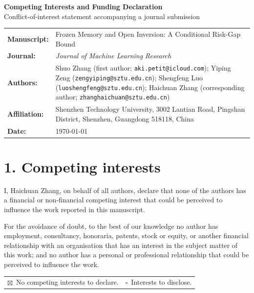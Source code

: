\documentclass[10pt]{article}
\newcommand{\checkedbox}{\ensuremath{\boxtimes}}
\newcommand{\uncheckedbox}{\ensuremath{\square}}
\begin{document}
\begin{center}
  {\Large\bfseries Competing Interests and Funding Declaration}\\[3pt]
  {\small Conflict-of-interest statement accompanying a journal submission}
\end{center}

\vspace{0.4em}

\begin{tabular}{@{}p{}p{}@{}}
\textbf{Manuscript:} &
Frozen Memory and Open Inversion: A Conditional
Risk-Gap Bound \\[4pt]
\textbf{Journal:} & \emph{Journal of Machine Learning Research} \\[4pt]
\textbf{Authors:} & {\raggedright Shuo Zhang (first author;
\texttt{aki.petit@icloud.com}); Yiping Zeng
(\texttt{zengyiping@sztu.edu.cn}); Shengfeng Luo
(\texttt{luoshengfeng@sztu.edu.cn}); Haichuan Zhang (corresponding author;
\texttt{zhanghaichuan@sztu.edu.cn})\par} \\[4pt]
\textbf{Affiliation:} & Shenzhen Technology University, 3002 Lantian Road, Pingshan
District, Shenzhen, Guangdong 518118, China \\[4pt]
\textbf{Date:} & \today
\end{tabular}

\vspace{0.5em}

\section*{1. Competing interests}

I, Haichuan Zhang, on behalf of all authors, declare that none of the authors has a
financial or non-financial competing interest that could be perceived to influence the
work reported in this manuscript.

For the avoidance of doubt, to the best of our knowledge no author has employment,
consultancy, honoraria, patents, stock or equity, or another financial relationship
with an organisation that has an interest in the subject matter of this work; and no
author has a personal or professional relationship that could be perceived to influence
the work.

\begin{tabular}{@{}p{}p{}@{}}
\checkedbox\ No competing interests to declare. & \uncheckedbox\ Interests to disclose. \\
\end{tabular}
\end{document}
